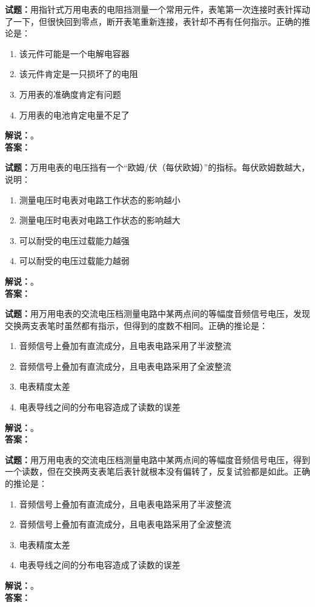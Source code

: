 \documentclass{ctexbook}
\begin{document}
\bigskip

\noindent\textbf{试题：}用指针式万用电表的电阻挡测量一个常用元件，表笔第一次连接时表针挥动了一下，但很快回到零点，断开表笔重新连接，表针却不再有任何指示。正确的推论是：
\begin{enumerate}[leftmargin=3em]
  \item 该元件可能是一个电解电容器
  \item 该元件肯定是一只损坏了的电阻
  \item 万用表的准确度肯定有问题
  \item 万用表的电池肯定电量不足了
\end{enumerate}
\noindent\textbf{解说：}\textbf{}。\\\noindent\textbf{答案：}

\bigskip

\noindent\textbf{试题：}万用电表的电压挡有一个“欧姆/伏（每伏欧姆）”的指标。每伏欧姆数越大，说明：
\begin{enumerate}[leftmargin=3em]
  \item 测量电压时电表对电路工作状态的影响越小
  \item 测量电压时电表对电路工作状态的影响越大
  \item 可以耐受的电压过载能力越强
  \item 可以耐受的电压过载能力越弱
\end{enumerate}
\noindent\textbf{解说：}\textbf{}。\\\noindent\textbf{答案：}

\bigskip

\noindent\textbf{试题：}用万用电表的交流电压档测量电路中某两点间的等幅度音频信号电压，发现交换两支表笔时虽然都有指示，但得到的度数不相同。正确的推论是：
\begin{enumerate}[leftmargin=3em]
  \item 音频信号上叠加有直流成分，且电表电路采用了半波整流
  \item 音频信号上叠加有直流成分，且电表电路采用了全波整流
  \item 电表精度太差
  \item 电表导线之间的分布电容造成了读数的误差
\end{enumerate}
\noindent\textbf{解说：}\textbf{}。\\\noindent\textbf{答案：}

\bigskip

\noindent\textbf{试题：}用万用电表的交流电压档测量电路中某两点间的等幅度音频信号电压，得到一个读数，但在交换两支表笔后表针就根本没有偏转了，反复试验都是如此。正确的推论是：
\begin{enumerate}[leftmargin=3em]
  \item 音频信号上叠加有直流成分，且电表电路采用了半波整流
  \item 音频信号上叠加有直流成分，且电表电路采用了全波整流
  \item 电表精度太差
  \item 电表导线之间的分布电容造成了读数的误差
\end{enumerate}
\noindent\textbf{解说：}\textbf{}。\\\noindent\textbf{答案：}
\end{document}
